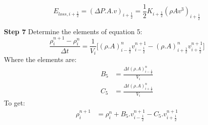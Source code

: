 \documentclass[11pt,letterpaper,titlepage]{article}
\newcommand{\half}{\frac{1}{2}}
\begin{document}
\begin{equation*}
E_{loss,i+\half}= (\Delta P.A.v)_{i+\half} = \half  K_{i+\half} (\rho A v^3)_{i+\half}     
\end{equation*}


\vspace{1.0cm}\noindent
\textbf{Step 7}\newline
Determine the elements of equation 5:
\begin{equation*}
\frac{\rho_i^{n+1} - \rho_i^{n}}{\Delta t} = \frac{1}{V_i}\biggr[ (\rho.A)_{i-\half}^{n}v_{i-\half}^{n+1}-(\rho.A)_{i+\half}^{n} v_{i+\half}^{n+1} \biggr]
\end{equation*}
\newline
Where the elements are:
\begin{equation*}
\begin{aligned}
B_5&=\frac{\Delta t (\rho.A)_{i-\half}^{n}}{V_i}\\
C_5&=\frac{\Delta t (\rho.A)_{i+\half}^{n}}{V_i}
\end{aligned}
\end{equation*}
\newline
To get:
\begin{equation}
\begin{aligned}
\rho_i^{n+1}&=\rho_i^{n}+B_5.v_{i-\half}^{n+1} - C_5.v_{i+\half}^{n+1}\\
\end{aligned}
\end{equation}
\end{document}
